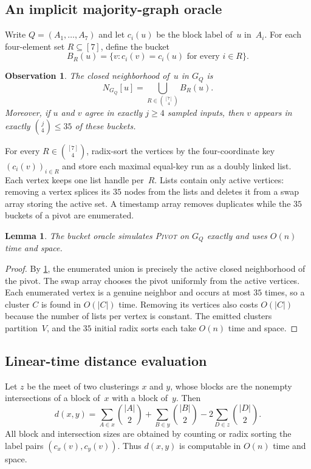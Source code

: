 \documentclass[11pt,letterpaper]{article}
\newtheorem{lemma}[theorem]{Lemma}
\newtheorem{observation}[theorem]{Observation}
\theoremstyle{definition}
\theoremstyle{remark}
\newcommand{\1}{\mathbf{1}}
\newcommand{\Pivot}{\textnormal{\textsc{Pivot}}}
\begin{document}
\subsection{An implicit majority-graph oracle}

Write $Q=(A_1,\ldots,A_7)$ and let $c_i(u)$ be the block label of~$u$ in~$A_i$.  For each four-element set $R\subseteq[7]$, define the bucket
\[
 B_R(u)=\{v:c_i(v)=c_i(u)\text{ for every }i\in R\}.
\]

\begin{observation}\label{obs:buckets}
The closed neighborhood of~$u$ in $G_Q$ is
\[
 N_{G_Q}[u]=\bigcup_{R\in\binom{[7]}4}B_R(u).
\]
Moreover, if $u$ and $v$ agree in exactly $j\ge4$ sampled inputs, then $v$ appears in exactly $\binom j4\le35$ of these buckets.
\end{observation}

For every $R\in\binom{[7]}4$, radix-sort the vertices by the four-coordinate key $(c_i(v))_{i\in R}$ and store each maximal equal-key run as a doubly linked list.  Each vertex keeps one list handle per~$R$.  Lists contain only active vertices: removing a vertex splices its $35$ nodes from the lists and deletes it from a swap array storing the active set.  A timestamp array removes duplicates while the $35$ buckets of a pivot are enumerated.

\begin{lemma}\label{lem:oracle}
The bucket oracle simulates \Pivot{} on $G_Q$ exactly and uses $O(n)$ time and space.
\end{lemma}

\begin{proof}
By \cref{obs:buckets}, the enumerated union is precisely the active closed neighborhood of the pivot.  The swap array chooses the pivot uniformly from the active vertices.  Each enumerated vertex is a genuine neighbor and occurs at most $35$ times, so a cluster $C$ is found in $O(|C|)$ time.  Removing its vertices also costs $O(|C|)$ because the number of lists per vertex is constant.  The emitted clusters partition~$V$, and the $35$ initial radix sorts each take $O(n)$ time and space.
\end{proof}

\subsection{Linear-time distance evaluation}

Let $z$ be the meet of two clusterings $x$ and $y$, whose blocks are the nonempty intersections of a block of~$x$ with a block of~$y$.  Then
\begin{equation}\label{eq:linear-distance}
 d(x,y)=
 \sum_{A\in x}\binom{|A|}{2}
 +\sum_{B\in y}\binom{|B|}{2}
 -2\sum_{D\in z}\binom{|D|}{2}.
\end{equation}
All block and intersection sizes are obtained by counting or radix sorting the label pairs $(c_x(v),c_y(v))$.  Thus $d(x,y)$ is computable in $O(n)$ time and space.
\end{document}
